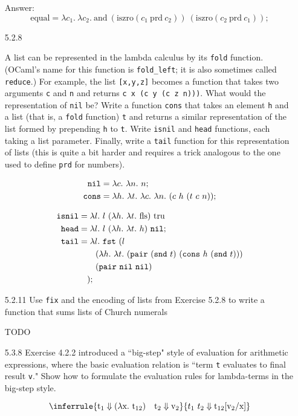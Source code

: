 \documentclass[12pt]{article}
\newcommand{\mt}[1]{\ensuremath{\text{#1}}}
\newcommand{\tru}{\mt{tru}}
\newcommand{\fls}{\mt{fls}}
\newcommand{\abstr}[1]{\lambda #1.\ }
\newcommand{\nil}{\mt{\texttt{nil}}}
\newcommand{\cons}{\mt{\texttt{cons}}}
\newcommand{\isnil}{\mt{\texttt{isnil}}}
\newcommand{\head}{\mt{\texttt{head}}}
\newcommand{\tail}{\mt{\texttt{tail}}}
\newcommand{\fst}{\mt{\texttt{fst}}}
\newcommand{\snd}{\mt{\texttt{snd}}}
\newcommand{\pair}{\mt{\texttt{pair}}}
\begin{document}
\begin{enumerate}
Answer:
$$
\mt{equal} = \abstr{c_1}\abstr{c_2} \mt{and} \ (\mt{iszro} (c_1 \ \mt{prd} \ c_2)) \ (\mt{iszro} (c_2 \ \mt{prd} \ c_1));
$$

\newpage
\item[5.2.8]

A list can be represented in the lambda calculus by its \texttt{fold} function. (OCaml's name for this function is \texttt{fold\_left}; it is also sometimes called \texttt{reduce}.) For example, the list \texttt{[x,y,z]} becomes a function that takes two arguments \texttt{c} and \texttt{n} and returns \texttt{c x (c y (c z n)))}. What would the representation of \texttt{nil} be? Write a function \texttt{cons} that takes an element \texttt{h} and a list (that is, a \texttt{fold} function) \texttt{t} and returns a similar representation of the list formed by prepending \texttt{h} to \texttt{t}. Write \texttt{isnil} and \texttt{head} functions, each taking a list parameter. Finally, write a \texttt{tail} function for this representation of lists (this is quite a bit harder and requires a trick analogous to the one used to define \texttt{prd} for numbers).

\begin{align*}
\nil &= \abstr{c} \abstr{n} n; \\
\cons &= \abstr{h} \abstr{t} \abstr{c} \abstr{n} (c \ h \ (t \ c \ n));
\end{align*}

\begin{align*}
\isnil &= \abstr{l} l \ (\abstr{h} \abstr{t} \fls) \ \tru \\
\head &= \abstr{l} l  \ (\abstr{h} \abstr{t} h) \ \nil; \\
\tail &= \abstr{l} \fst \ (l \\
&\qquad (\abstr{h} \abstr{t} (\pair \ (\snd \ t) \ (\cons \ h \ (\snd \ t))) \\
&\qquad (\pair \ \nil \ \nil) \\
&\quad);
\end{align*}


\item[5.2.11] Use \texttt{fix} and the encoding of lists from Exercise 5.2.8 to write a function that sums lists of Church numerals

TODO

\item[5.3.8] Exercise 4.2.2 introduced a ``big-step" style of evaluation for
arithmetic expressions, where the basic evaluation relation is ``term \texttt{t} evaluates to final result \texttt{v}." Show how to formulate the evaluation rules for lambda-terms in the big-step style.

$$
\inferrule{
  \mt{t}_1 \Downarrow (\abstr{\mt{x}} \mt{t}_{12}) \quad \mt{t}_2 \Downarrow \mt{v}_2
}{ t_1 \ t_2 \Downarrow \mt{t}_{12}[\mt{v}_2/\mt{x}]
}
$$

\end{enumerate}

\newpage
\end{document}
